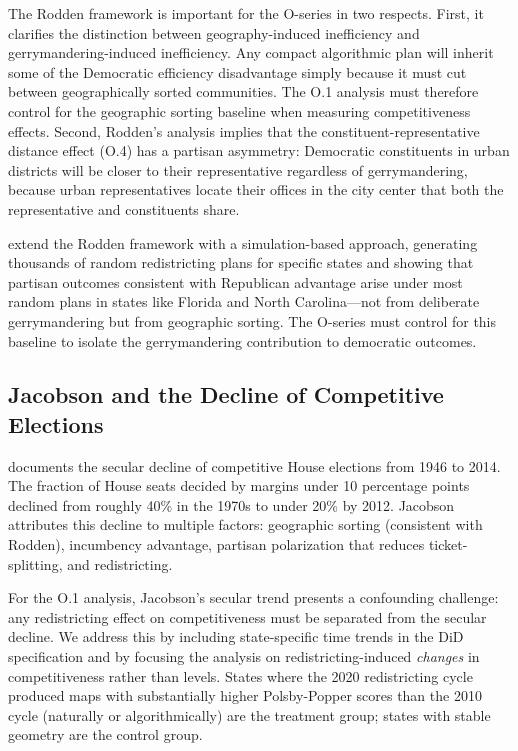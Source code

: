 The Rodden framework is important for the O-series in two respects. First, it clarifies
the distinction between geography-induced inefficiency and gerrymandering-induced
inefficiency. Any compact algorithmic plan will inherit some of the Democratic
efficiency disadvantage simply because it must cut between geographically sorted
communities. The O.1 analysis must therefore control for the geographic sorting
baseline when measuring competitiveness effects. Second, Rodden's analysis implies
that the constituent-representative distance effect (O.4) has a partisan asymmetry:
Democratic constituents in urban districts will be closer to their representative
regardless of gerrymandering, because urban representatives locate their offices
in the city center that both the representative and constituents share.

\citet{chen2013} extend the Rodden framework with a simulation-based approach,
generating thousands of random redistricting plans for specific states and showing
that partisan outcomes consistent with Republican advantage arise under most random
plans in states like Florida and North Carolina---not from deliberate gerrymandering
but from geographic sorting. The O-series must control for this baseline to isolate
the gerrymandering contribution to democratic outcomes.

\subsection{Jacobson and the Decline of Competitive Elections}

\citet{jacobson2015} documents the secular decline of competitive House elections
from 1946 to 2014. The fraction of House seats decided by margins under 10 percentage
points declined from roughly 40\% in the 1970s to under 20\% by 2012. Jacobson
attributes this decline to multiple factors: geographic sorting (consistent with Rodden),
incumbency advantage, partisan polarization that reduces ticket-splitting, and
redistricting.

For the O.1 analysis, Jacobson's secular trend presents a confounding challenge:
any redistricting effect on competitiveness must be separated from the secular decline.
We address this by including state-specific time trends in the DiD specification and
by focusing the analysis on redistricting-induced \textit{changes} in competitiveness
rather than levels. States where the 2020 redistricting cycle produced maps with
substantially higher Polsby-Popper scores than the 2010 cycle (naturally or algorithmically)
are the treatment group; states with stable geometry are the control group.

